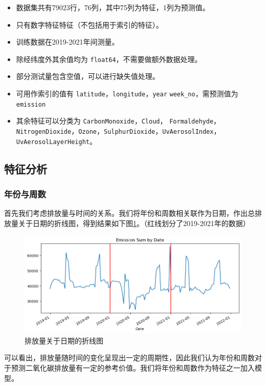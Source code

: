 \documentclass{ctexart}
\begin{document}
\begin{itemize}
      \item 数据集共有79023行，76列，其中75列为特征，1列为预测值。
      \item 只有数字特征特征（不包括用于索引的特征）。
      \item 训练数据在2019-2021年间测量。
      \item 除经纬度外其余值均为 \texttt{float64}，不需要做额外数据处理。
      \item 部分测试量包含空值，可以进行缺失值处理。
      \item 可用作索引的值有 \texttt{latitude}，\texttt{longitude}，\texttt{year} \texttt{week\_no}，需预测值为 \texttt{emission}
      \item 其余特征可以分类为 \texttt{CarbonMonoxide}，\texttt{Cloud}， \texttt{Formaldehyde}，\texttt{NitrogenDioxide}，\texttt{Ozone}，\texttt{SulphurDioxide}，\texttt{UvAerosolIndex}，\texttt{UvAerosolLayerHeight}。
\end{itemize}

\subsection{特征分析}

\subsubsection{年份与周数}

首先我们考虑排放量与时间的关系。我们将年份和周数相关联作为日期，作出总排放量关于日期的折线图，得到结果如下图\ref{fig:2}。（红线划分了2019-2021年的数据）

\begin{figure}[H]
      \centering
      \includegraphics[width=1\textwidth]{output2.png}
      \caption{\label{fig:2}排放量关于日期的折线图}
\end{figure}

可以看出，排放量随时间的变化呈现出一定的周期性，因此我们认为年份和周数对于预测二氧化碳排放量有一定的参考价值。我们将年份和周数作为特征之一加入模型。
\end{document}
